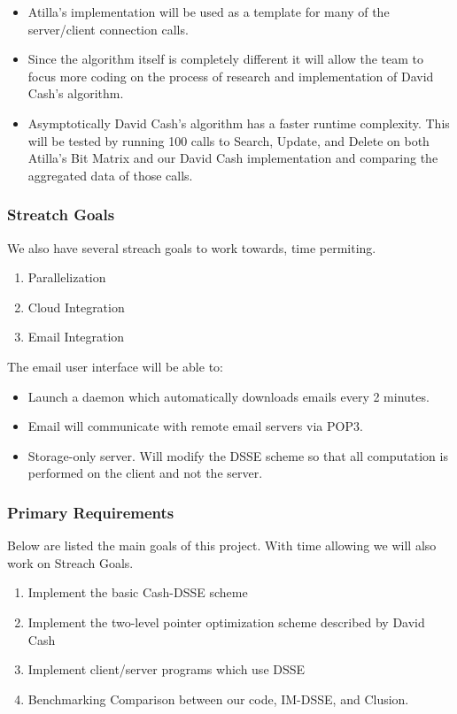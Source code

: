 \begin{itemize}
\item Atilla's implementation will be used as a template for many of the server/client connection calls. 

\item Since the algorithm itself is completely different it will allow the team to focus more coding on the process of research and implementation of David Cash's algorithm.

\item Asymptotically David Cash's algorithm has a faster runtime complexity. This will be tested by running 100 calls to Search, Update, and Delete on both Atilla's Bit Matrix and our David Cash implementation and comparing the aggregated data of those calls.
\end{itemize}

\subsubsection{ Streatch Goals }
We also have several streach goals to work towards, time permiting.

\begin{enumerate}
\item Parallelization
\item Cloud Integration
\item Email Integration
\end{enumerate}


The email user interface will be able to:
\begin{itemize}	
\item Launch a daemon which automatically downloads emails every 2 minutes.
\item Email will communicate with remote email servers via POP3.
\end{itemize}
\begin{itemize}
\item Storage-only server. Will modify the DSSE scheme so that all computation is performed on the client and not the server.
\end{itemize}


\subsubsection{Primary Requirements}
Below are listed the main goals of this project. With time allowing we will also work on Streach Goals.

\begin{enumerate}
\item Implement the basic Cash-DSSE scheme
\item Implement the two-level pointer optimization scheme described by David Cash
\item Implement client/server programs which use DSSE
\item Benchmarking Comparison between our code, IM-DSSE\cite{im-dsse}, and Clusion\cite{clusion}.
\end{enumerate}



